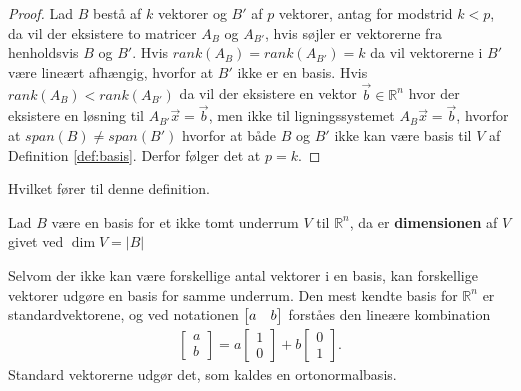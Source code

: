 \begin{proof}
Lad $B$ bestå af $k$ vektorer og $B'$ af $p$ vektorer, antag for modstrid $k < p$, da vil der eksistere to matricer $A_{B}$ og $A_{B'}$, hvis søjler er vektorerne fra henholdsvis $B$ og $B'$.
Hvis $rank(A_{B}) = rank(A_{B'}) = k$ da vil vektorerne i $B'$ være lineært afhængig, hvorfor at $B'$ ikke er en basis.
Hvis $rank(A_{B}) < rank(A_{B'} )$ da vil der eksistere en vektor $\vec{b} \in \mathds{R}^n$ hvor der eksistere en løsning til $A_{B'}\vec{x} = \vec{b}$, men ikke til ligningssystemet $A_B \vec{x}=\vec{b}$, hvorfor at $span(B) \neq span(B')$ hvorfor at både $B$ og $B'$ ikke kan være basis til $V$ af Definition \ref{def:basis}.
Derfor følger det at $p=k$.
\end{proof}
Hvilket fører til denne definition.
\begin{defn}[Dimension]
Lad $B$ være en basis for et ikke tomt underrum $V$ til $\mathds{R}^n$, da er \textbf{dimensionen} af $V$ givet ved $\dim{V} = |B|$
\label{def:dim}
\end{defn}
Selvom der ikke kan være forskellige antal vektorer i en basis, kan forskellige vektorer udgøre en basis for samme underrum.
Den mest kendte basis for $\mathds{R}^n$ er standardvektorene, og ved notationen $\begin{bmatrix} a & b \end{bmatrix}$ forståes den lineære kombination
\begin{align*}
\begin{bmatrix} a \\ b \end{bmatrix} = a\begin{bmatrix} 1 \\0 \end{bmatrix} + b \begin{bmatrix} 0 \\ 1 \end{bmatrix}.
\end{align*}
Standard vektorerne udgør det, som kaldes en ortonormalbasis.




